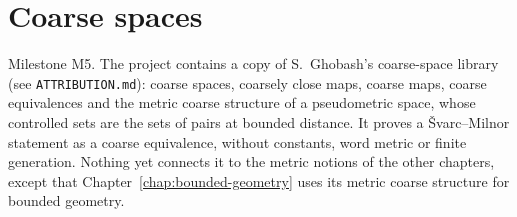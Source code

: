 \chapter{Coarse spaces}
\label{chap:coarse-spaces}

Milestone M5. The project contains a copy of S.~Ghobash's coarse-space library (see
\texttt{ATTRIBUTION.md}): coarse spaces, coarsely close maps, coarse maps, coarse equivalences and
the metric coarse structure of a pseudometric space, whose controlled sets are the sets of pairs at
bounded distance. It proves a \v{S}varc--Milnor statement as a coarse equivalence, without
constants, word metric or finite generation. Nothing yet connects it to the metric notions of the
other chapters, except that Chapter~\ref{chap:bounded-geometry} uses its metric coarse structure
for bounded geometry.

